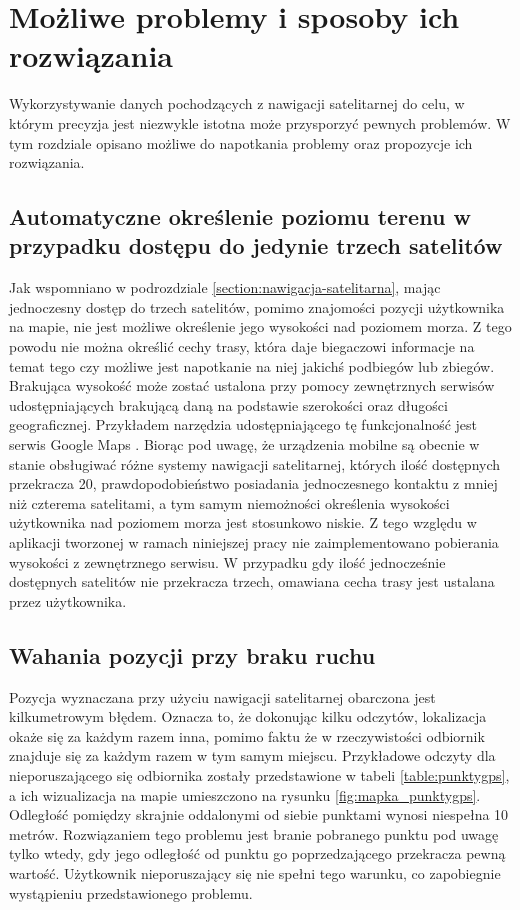\section{Możliwe problemy i sposoby ich rozwiązania}
Wykorzystywanie danych pochodzących z nawigacji satelitarnej do celu, w którym precyzja jest niezwykle istotna może przysporzyć pewnych problemów. W tym rozdziale opisano możliwe do napotkania problemy oraz propozycje ich rozwiązania.
\subsection{Automatyczne określenie poziomu terenu w przypadku dostępu do jedynie trzech satelitów}\label{chap:problem-poziom-terenu}
Jak wspomniano w podrozdziale \ref{section:nawigacja-satelitarna}, mając jednoczesny dostęp do trzech satelitów, pomimo znajomości pozycji użytkownika na mapie, nie jest możliwe określenie jego wysokości nad poziomem morza. Z tego powodu nie można określić cechy trasy, która daje biegaczowi informacje na temat tego czy możliwe jest napotkanie na niej jakichś podbiegów lub zbiegów. Brakująca wysokość może zostać ustalona przy pomocy zewnętrznych serwisów udostępniających brakującą daną na podstawie szerokości oraz długości geograficznej. Przykładem narzędzia udostępniającego tę funkcjonalność jest serwis Google Maps \cite{googlemaps}. Biorąc pod uwagę, że urządzenia mobilne są obecnie w stanie obsługiwać różne systemy nawigacji satelitarnej, których ilość dostępnych przekracza 20, prawdopodobieństwo posiadania jednoczesnego kontaktu z mniej niż czterema satelitami, a tym samym niemożności określenia wysokości użytkownika nad poziomem morza jest stosunkowo niskie. Z tego względu w aplikacji tworzonej w ramach niniejszej pracy nie zaimplementowano pobierania wysokości z zewnętrznego serwisu. W przypadku gdy ilość jednocześnie dostępnych satelitów nie przekracza trzech, omawiana cecha trasy jest ustalana przez użytkownika.
\subsection{Wahania pozycji przy braku ruchu}\label{chap:wahania-pozycji}
Pozycja wyznaczana przy użyciu nawigacji satelitarnej obarczona jest kilkumetrowym błędem. Oznacza to, że dokonując kilku odczytów, lokalizacja okaże się za każdym razem inna, pomimo faktu że w rzeczywistości odbiornik znajduje się za każdym razem w tym samym miejscu. Przykładowe odczyty dla nieporuszającego się odbiornika zostały przedstawione w tabeli \ref{table:punktygps}, a ich wizualizacja na mapie umieszczono na rysunku \ref{fig:mapka_punktygps}. Odległość pomiędzy skrajnie oddalonymi od siebie punktami wynosi niespełna 10 metrów. Rozwiązaniem tego problemu jest branie pobranego punktu pod uwagę tylko wtedy, gdy jego odległość od punktu go poprzedzającego przekracza pewną wartość. Użytkownik nieporuszający się nie spełni tego warunku, co zapobiegnie wystąpieniu przedstawionego problemu.

